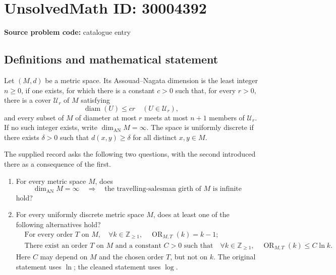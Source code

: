\documentclass[11pt]{article}
\newcommand{\Z}{\mathbb{Z}}
\begin{document}
\section*{UnsolvedMath ID: 30004392}
\textbf{Source problem code:} catalogue entry
\subsection{Definitions and mathematical statement}
Let \((M,d)\) be a metric space. Its Assouad--Nagata dimension is the least integer \(n\geq 0\), if one exists, for which there is a constant \(c>0\) such that, for every \(r>0\), there is a cover \(\mathcal U_r\) of \(M\) satisfying
\[
\operatorname{diam}(U)\leq cr\quad(U\in\mathcal U_r),
\]
and every subset of \(M\) of diameter at most \(r\) meets at most \(n+1\) members of \(\mathcal U_r\). If no such integer exists, write \(\dim_{\mathrm{AN}}M=\infty\). The space is uniformly discrete if there exists \(\delta>0\) such that \(d(x,y)\geq\delta\) for all distinct \(x,y\in M\).

The supplied record asks the following two questions, with the second introduced there as a consequence of the first.

\begin{enumerate}
\item For every metric space \(M\), does
\[
\dim_{\mathrm{AN}}M=\infty
\quad\Longrightarrow\quad
\text{the travelling-salesman girth of }M\text{ is infinite}
\]
hold?
\item For every uniformly discrete metric space \(M\), does at least one of the following alternatives hold?
\[
\begin{aligned}
&\text{For every order }T\text{ on }M,\quad
  \forall k\in\Z_{\geq1},\quad
  \operatorname{OR}_{M,T}(k)=k-1;\\
&\text{There exist an order }T\text{ on }M\text{ and a constant }C>0
  \text{ such that}\quad
  \forall k\in\Z_{\geq1},\quad
  \operatorname{OR}_{M,T}(k)\leq C\ln k.
\end{aligned}
\]
Here \(C\) may depend on \(M\) and the chosen order \(T\), but not on \(k\). The original statement uses \(\ln\); the cleaned statement uses \(\log\).
\end{enumerate}
\end{document}
